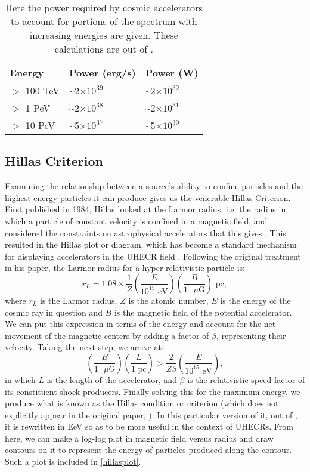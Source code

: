  \begin{table}

 \begin{center}
\begin{tabular}{|l|l|l|} \hline
 Energy & Power (erg/s)  & Power (W)  \\ \hline
 $>$ 100 TeV& \textasciitilde2$\times10^{39}$ &\textasciitilde2$\times10^{32}$ \\ \hline
 $>$ 1 PeV& \textasciitilde2$\times10^{38}$ &\textasciitilde 2$\times10^{31}$ \\ \hline
$>$ 10 PeV &\textasciitilde 5$\times10^{37}$ &\textasciitilde 5$\times10^{30}$  \\ \hline
\end{tabular}
\end{center}
\caption[Power of Cosmic Accelerators]{Here the power required by cosmic accelerators to account for portions of the spectrum with increasing energies are given. These calculations are out of \cite{crapp}.}
 \label{powereqs}
\end{table}
\subsection{Hillas Criterion}
Examining the relationship between a source's ability to confine particles and the highest energy particles it can produce gives us the venerable Hillas Criterion. First published in 1984, Hillas looked at the Larmor radius, i.e. the radius in which a particle of constant velocity is confined in a magnetic field, and considered the constraints on astrophysical accelerators that this gives \cite{hillas}. This resulted in the Hillas plot or diagram, which has become a standard mechanism for displaying accelerators in the UHECR field \cite{stanev}. Following the original treatment in his paper, the Larmor radius for a hyper-relativistic particle is:
$$ r_L=1.08\times\frac{1}{Z}\left(\frac{E}{10^{15}\mbox{ eV}}\right)\left(\frac{B}{1\mbox{ $\mu$G}}\right)\mbox{ pc}, $$
where $r_L$ is the Larmor radius, $Z$ is the atomic number, $E$ is the energy of the cosmic ray in question and $B$ is the magnetic field of the potential accelerator. We can put this expression in terms of the energy and account for the net movement of the magnetic centers by adding a factor of $\beta$, representing their velocity. Taking the next step, we arrive at:
$$\left(\frac{B}{1\mbox{ $\mu$G}}\right) \left(\frac{L}{1\mbox{ pc}}\right)>\frac{2}{Z \beta}\left(\frac{E}{10^{15}\mbox{ eV}}\right),$$
in which $L$ is the length of the accelerator, and $\beta$ is the relativistic speed factor of its constituent shock producers. Finally solving this for the maximum energy, we produce what is known as the Hillas condition or criterion (which does not explicitly appear in the original paper, \cite{hillas}):
In this particular version of it, out of \cite{stanev}, it is rewritten in EeV so as to be more useful in the context of UHECRs. From here, we can make a log-log plot in magnetic field versus radius and draw contours on it to represent the energy of particles produced along the contour. Such a plot is included in \autoref{hillasplot}.

